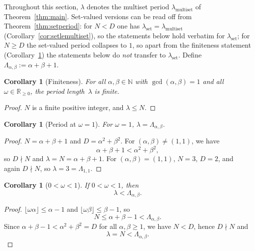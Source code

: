 \documentclass[11pt,reqno]{amsart}
\theoremstyle{plain}
\newtheorem{corollary}[theorem]{Corollary}
\theoremstyle{definition}
\theoremstyle{remark}
\begin{document}
Throughout this section, \(\lambda\) denotes the multiset period
\(\lambda_{\mathrm{multiset}}\) of Theorem~\ref{thm:main}.  Set-valued
versions can be read off from Theorem~\ref{thm:setperiod}: for
\(N < D\) one has \(\lambda_{\mathrm{set}} = \lambda_{\mathrm{multiset}}\)
(Corollary~\ref{cor:setlemultiset}), so the statements below hold
verbatim for \(\lambda_{\mathrm{set}}\); for \(N \ge D\) the set-valued
period collapses to \(1\), so apart from the finiteness statement
(Corollary~\ref{cor:finite}) the statements below do \emph{not}
transfer to \(\lambda_{\mathrm{set}}\).  Define
\(\Lambda_{\alpha,\beta} := \alpha + \beta + 1\).

\begin{corollary}[Finiteness]\label{cor:finite}
For all \(\alpha, \beta \in \mathbb{N}\) with \(\gcd(\alpha,\beta)=1\) and
all \(\omega \in \mathbb{R}_{\ge 0}\), the period length~\(\lambda\) is
finite.
\end{corollary}

\begin{proof}
\(N\) is a finite positive integer, and \(\lambda \le N\).
\end{proof}

\begin{corollary}[Period at \(\omega = 1\)]\label{cor:omega1}
For \(\omega = 1\), \(\lambda = \Lambda_{\alpha,\beta}\).

\end{corollary}

\begin{proof}
\(N = \alpha + \beta + 1\) and \(D = \alpha^2+\beta^2\).
For \((\alpha,\beta) \ne (1,1)\), we have
\[
    \alpha+\beta+1 < \alpha^2+\beta^2,
\]
so \(D \nmid N\) and \(\lambda = N = \alpha+\beta+1\).
For \((\alpha,\beta) = (1,1)\), \(N = 3\), \(D = 2\), and again
\(D \nmid N\), so \(\lambda = 3 = \Lambda_{1,1}\).
\end{proof}

\begin{corollary}[\(0 < \omega < 1\)]\label{cor:small_omega}
If \(0 < \omega < 1\), then
\[
    \lambda < \Lambda_{\alpha,\beta}.
\]
\end{corollary}

\begin{proof}
\(\lfloor\omega\alpha\rfloor \le \alpha - 1\) and
\(\lfloor\omega\beta\rfloor \le \beta - 1\), so
\[
    N \le \alpha + \beta - 1 < \Lambda_{\alpha,\beta}.
\]
Since \(\alpha + \beta - 1 < \alpha^2 + \beta^2 = D\) for all
\(\alpha, \beta \ge 1\), we have \(N < D\), hence \(D \nmid N\) and
\[
    \lambda = N < \Lambda_{\alpha,\beta}.
\]
\end{proof}
\end{document}
